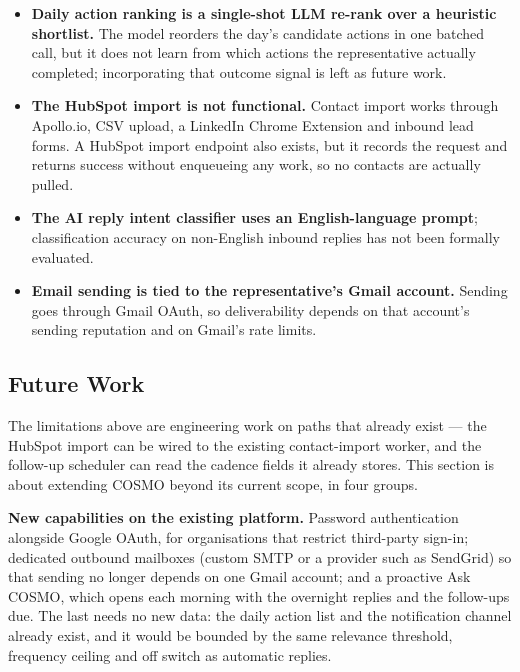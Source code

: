 \documentclass[a4paper]{article}
\begin{document}
\begin{itemize}
  \item \textbf{Daily action ranking is a single-shot LLM
    re-rank over a heuristic shortlist.} The model reorders the
    day's candidate actions in one batched call, but it does not
    learn from which actions the representative actually completed;
    incorporating that outcome signal is left as future work.

  \item \textbf{The HubSpot import is not functional.} Contact import
    works through Apollo.io, CSV upload, a LinkedIn Chrome Extension and
    inbound lead forms. A HubSpot import endpoint also exists, but it records
    the request and returns success without enqueueing any work, so no
    contacts are actually pulled.

  \item \textbf{The AI reply intent classifier uses an
    English-language prompt}; classification accuracy on
    non-English inbound replies has not been formally evaluated.

  \item \textbf{Email sending is tied to the representative's Gmail
    account.} Sending goes through Gmail OAuth, so deliverability depends on
    that account's sending reputation and on Gmail's rate limits.

\end{itemize}

\subsection{Future Work}
\label{sec:future-work}

The limitations above are engineering work on paths that already exist ---
the HubSpot import can be wired to the existing contact-import worker, and the
follow-up scheduler can read the cadence fields it already stores. This section is about extending COSMO beyond its current scope, in
four groups.

\textbf{New capabilities on the existing platform.} Password authentication
alongside Google OAuth, for organisations that restrict third-party sign-in;
dedicated outbound mailboxes (custom SMTP or a provider such as SendGrid) so
that sending no longer depends on one Gmail account; and a proactive Ask COSMO,
which opens each morning with the overnight replies and the follow-ups due. The
last needs no new data: the daily action list and the notification channel
already exist, and it would be bounded by the same relevance threshold,
frequency ceiling and off switch as automatic replies.
\end{document}

